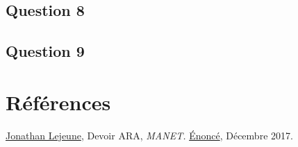 \documentclass[10pt]{report}
\begin{document}
\subsection{Question 8}
\subsection{Question 9}
\newpage
\section*{Références}
\href{https://pages.lip6.fr/Jonathan.Lejeune/}{Jonathan Lejeune}, Devoir ARA, \textit{MANET.} \href{https://pages.lip6.fr/Jonathan.Lejeune/documents/enseignements/ARA/sujet\_devoir\_2017\_2018.pdf}{Énoncé}, Décembre 2017.\\

\newpage
%
\end{document}
